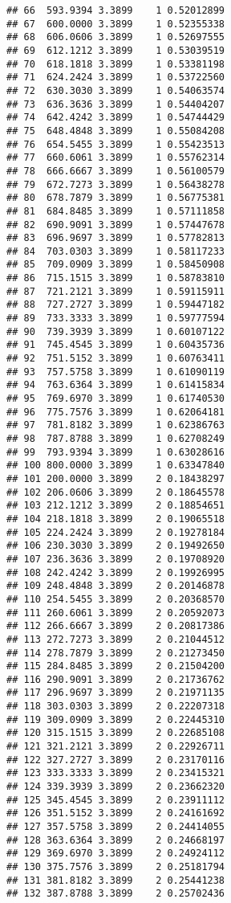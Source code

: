 \documentclass[
]{article}
\begin{document}
\begin{verbatim}
## 66  593.9394 3.3899    1 0.52012899
## 67  600.0000 3.3899    1 0.52355338
## 68  606.0606 3.3899    1 0.52697555
## 69  612.1212 3.3899    1 0.53039519
## 70  618.1818 3.3899    1 0.53381198
## 71  624.2424 3.3899    1 0.53722560
## 72  630.3030 3.3899    1 0.54063574
## 73  636.3636 3.3899    1 0.54404207
## 74  642.4242 3.3899    1 0.54744429
## 75  648.4848 3.3899    1 0.55084208
## 76  654.5455 3.3899    1 0.55423513
## 77  660.6061 3.3899    1 0.55762314
## 78  666.6667 3.3899    1 0.56100579
## 79  672.7273 3.3899    1 0.56438278
## 80  678.7879 3.3899    1 0.56775381
## 81  684.8485 3.3899    1 0.57111858
## 82  690.9091 3.3899    1 0.57447678
## 83  696.9697 3.3899    1 0.57782813
## 84  703.0303 3.3899    1 0.58117233
## 85  709.0909 3.3899    1 0.58450908
## 86  715.1515 3.3899    1 0.58783810
## 87  721.2121 3.3899    1 0.59115911
## 88  727.2727 3.3899    1 0.59447182
## 89  733.3333 3.3899    1 0.59777594
## 90  739.3939 3.3899    1 0.60107122
## 91  745.4545 3.3899    1 0.60435736
## 92  751.5152 3.3899    1 0.60763411
## 93  757.5758 3.3899    1 0.61090119
## 94  763.6364 3.3899    1 0.61415834
## 95  769.6970 3.3899    1 0.61740530
## 96  775.7576 3.3899    1 0.62064181
## 97  781.8182 3.3899    1 0.62386763
## 98  787.8788 3.3899    1 0.62708249
## 99  793.9394 3.3899    1 0.63028616
## 100 800.0000 3.3899    1 0.63347840
## 101 200.0000 3.3899    2 0.18438297
## 102 206.0606 3.3899    2 0.18645578
## 103 212.1212 3.3899    2 0.18854651
## 104 218.1818 3.3899    2 0.19065518
## 105 224.2424 3.3899    2 0.19278184
## 106 230.3030 3.3899    2 0.19492650
## 107 236.3636 3.3899    2 0.19708920
## 108 242.4242 3.3899    2 0.19926995
## 109 248.4848 3.3899    2 0.20146878
## 110 254.5455 3.3899    2 0.20368570
## 111 260.6061 3.3899    2 0.20592073
## 112 266.6667 3.3899    2 0.20817386
## 113 272.7273 3.3899    2 0.21044512
## 114 278.7879 3.3899    2 0.21273450
## 115 284.8485 3.3899    2 0.21504200
## 116 290.9091 3.3899    2 0.21736762
## 117 296.9697 3.3899    2 0.21971135
## 118 303.0303 3.3899    2 0.22207318
## 119 309.0909 3.3899    2 0.22445310
## 120 315.1515 3.3899    2 0.22685108
## 121 321.2121 3.3899    2 0.22926711
## 122 327.2727 3.3899    2 0.23170116
## 123 333.3333 3.3899    2 0.23415321
## 124 339.3939 3.3899    2 0.23662320
## 125 345.4545 3.3899    2 0.23911112
## 126 351.5152 3.3899    2 0.24161692
## 127 357.5758 3.3899    2 0.24414055
## 128 363.6364 3.3899    2 0.24668197
## 129 369.6970 3.3899    2 0.24924112
## 130 375.7576 3.3899    2 0.25181794
## 131 381.8182 3.3899    2 0.25441238
## 132 387.8788 3.3899    2 0.25702436

\end{verbatim}
\end{document}
